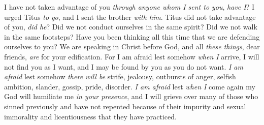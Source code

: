 \begin{biblechapter}
\verse I have not taken advantage of you \textit{through anyone whom I sent to you}, \textit{have I}?
\verse I urged Titus \textit{to go}, and I sent the brother \textit{with him}. Titus did not take advantage of you, \textit{did he}? Did we not conduct ourselves in the same spirit? Did we not walk in the same footsteps?
\verse Have you been thinking all this time that we are defending ourselves to you? We are speaking in Christ before God, and all \textit{these things}, dear friends, \textit{are} for your edification.
\verse For I am afraid lest somehow \textit{when I} arrive, I will not find you as I want, and I may be found by you as you do not want. \textit{I am afraid} lest somehow \textit{there will be} strife, jealousy, outbursts of anger, selfish ambition, slander, gossip, pride, disorder.
\verse \textit{I am afraid} lest \textit{when I} come again my God will humiliate me \textit{in your presence}, and I will grieve over many of those who sinned previously and have not repented because of their impurity and sexual immorality and licentiousness that they have practiced.
\end{biblechapter}


